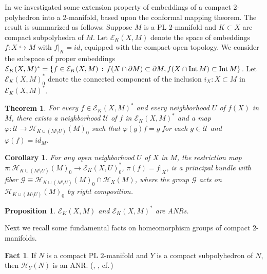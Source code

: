 \documentclass[11pt]{amsart}
\newtheorem{theorem}{Theorem}[section]
\newtheorem{proposition}{Proposition}[section]
\newtheorem{corollary}{Corollary}[section]
\theoremstyle{definition}
\newtheorem{fact}{Fact}[section]
\newtheorem*{Proof of Theorem 3.1}{Proof of Theorem 3.1}
\newtheorem*{Proof of Corollary 3.1}{Proof of Corollary 3.1}
\newtheorem*{Proof of Proposition 4.1.(1)}{Proof of Proposition 4.1.(1)}
\newtheorem*{Proof of Proposition 4.1.(2)}{Proof of Proposition 4.1.(2)}
\newtheorem*{Proof of Corollary 1.1}{Proof of Corollary 1.1}
\def \cal {\mathcal}
\def \phi {\varphi}
\begin{document}
In \cite{Ya} we investigated some extension property of embeddings of a compact 2-polyhedron into a 2-manifold, based upon the conformal mapping theorem. The result is summarized as follows:  
Suppose $M$ is a PL 2-manifold and $K \subset X$ are compact subpolyhedra of $M$. Let ${\cal E}_K(X, M)$ denote the space of embeddings $f : X \hookrightarrow M$ with $f|_K = id$, equipped with the compact-open topology. We consider the subspace of proper embeddings ${\cal E}_K(X, M)^{\ast} = \{f \in {\cal E}_K(X,M) \, : \, f(X \cap \partial M) \subset \partial M, f(X \cap {\rm Int} \,M) \subset {\rm Int} \, M \}$. Let ${\cal E}_K(X, M)^{\ast}_0$ denote the connected component of the inclusion $i_X : X \subset M$ in ${\cal E}_K(X, M)^{\ast}$.  

\begin{theorem}
For every $f \in {\mathcal E}_K(X, M)^{\ast}$ and every neighborhood $U$ of $f(X)$ in $M$, there exists a neighborhood ${\mathcal U}$ of $f$ in ${\mathcal E}_K(X, M)^{\ast}$ and a map $\phi : {\mathcal U} \to {\mathcal H}_{K \cup (M \setminus U)}(M)_0$ such that $\phi(g)f = g$ for each $g \in {\mathcal U}$ and $\phi(f) = id_M$.
\end{theorem}

\begin{corollary}
For any open neighborhood $U$ of $X$ in $M$, the restriction map $\pi : {\cal H}_{K \cup (M \setminus U)}(M)_0 \to {\cal E}_K(X, U)_0^{\ast}$, $\pi(f) = f|_X$, is a principal bundle with fiber ${\cal G} \equiv {\cal H}_{K \cup (M \setminus U)}(M)_0 \cap {\mathcal H}_X(M)$, where the group ${\mathcal G}$ acts on ${\cal H}_{K \cup (M \setminus U)}(M)_0$ by right composition. 
\end{corollary}

\begin{proposition}
${\cal E}_K(X, M)$ and ${\cal E}_K(X, M)^{\ast}$ are ANRs.
\end{proposition}

Next we recall some fundamental facts on homeomorphism groups of compact 2-manifolds. 

\begin{fact} 
If $N$ is a compact PL $2$-manifold and $Y$ is a compact subpolyhedron of $N$, then ${\cal H}_Y(N)$ is an ANR. (\cite{Ja}, \cite{LM}, cf.\,\cite[Lemma 3.2]{Ya}) 
\end{fact} 
\end{document}
